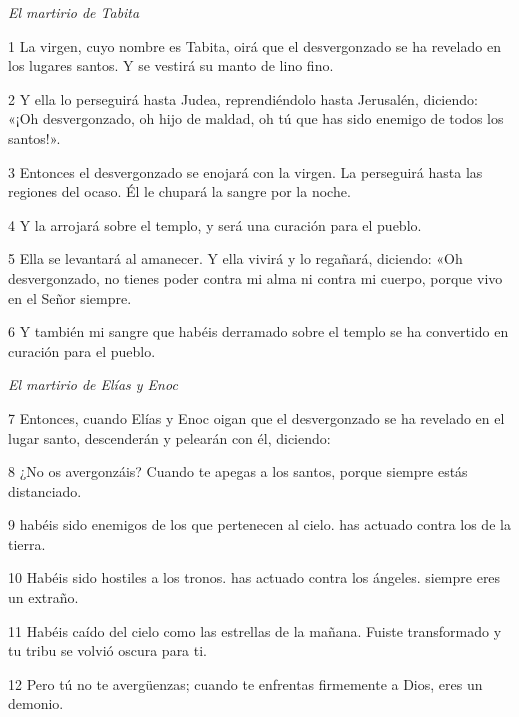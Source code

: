 \par \textit{El martirio de Tabita}

\par 1 La virgen, cuyo nombre es Tabita, oirá que el desvergonzado se ha revelado en los lugares santos. Y se vestirá su manto de lino fino.

\par 2 Y ella lo perseguirá hasta Judea, reprendiéndolo hasta Jerusalén, diciendo: «¡Oh desvergonzado, oh hijo de maldad, oh tú que has sido enemigo de todos los santos!».

\par 3 Entonces el desvergonzado se enojará con la virgen. La perseguirá hasta las regiones del ocaso. Él le chupará la sangre por la noche.

\par 4 Y la arrojará sobre el templo, y será una curación para el pueblo.

\par 5 Ella se levantará al amanecer. Y ella vivirá y lo regañará, diciendo: «Oh desvergonzado, no tienes poder contra mi alma ni contra mi cuerpo, porque vivo en el Señor siempre.

\par 6 Y también mi sangre que habéis derramado sobre el templo se ha convertido en curación para el pueblo.


\par \textit{El martirio de Elías y Enoc}

\par 7 Entonces, cuando Elías y Enoc oigan que el desvergonzado se ha revelado en el lugar santo, descenderán y pelearán con él, diciendo:

\par 8 ¿No os avergonzáis? Cuando te apegas a los santos, porque siempre estás distanciado.

\par 9 habéis sido enemigos de los que pertenecen al cielo. has actuado contra los de la tierra.

\par 10 Habéis sido hostiles a los tronos. has actuado contra los ángeles. siempre eres un extraño.

\par 11 Habéis caído del cielo como las estrellas de la mañana. Fuiste transformado y tu tribu se volvió oscura para ti.

\par 12 Pero tú no te avergüenzas; cuando te enfrentas firmemente a Dios, eres un demonio.

